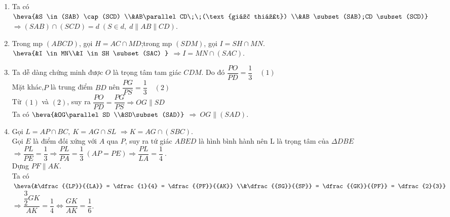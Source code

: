 \begin{ex}
{\begin{enumerate}
			\item  Ta có
			 $\heva{&S \in (SAB) \cap (SCD) \\&AB\parallel CD\;\;(\text{giả thiết}) \\&AB \subset (SAB);CD \subset (SCD)}$
			$ \Rightarrow (SAB) \cap (SCD) = d\;\left( {S \in d,\;d\parallel AB\parallel  CD} \right)$.
			\item 
			Trong mp $(ABCD)$, gọi $H=AC\cap MD$;trong  mp $(SDM)$, gọi $I=SH\cap MN$.\\
			$\heva{&I \in MN\\&I  \in SH \subset (SAC) }$
			$ \Rightarrow I =  MN \cap (SAC)$.
			\item Ta dễ dàng chứng minh được $O$ là trọng tâm tam giác $CDM$. Do  đó $\dfrac{PO}{PD}=\dfrac{1}{3}\quad (1)$\\
			Mặt khác,$P$ là trung điểm $BD$ nên  $ \dfrac{PG}{PS}=\dfrac{1}{3} \quad (2)$\\
			Từ $(1)$ và $(2)$, suy  ra $ \dfrac{PO}{PD}=\dfrac{PG}{PS}\Rightarrow OG$$\parallel$$SD$\\
			Ta  có
			$\heva{&OG\parallel  SD \\&SD\subset (SAD)}$
			 $ \Rightarrow \ OG\parallel(SAD)$.
			 \item
			Gọi $L=AP\cap BC,\ K=AG\cap SL$ $\Rightarrow K=AG\cap (SBC)$. \\Gọi $E$ là điểm đối xứng với  $A$ qua $P$, suy ra tứ giác $ABED$ là hình bình hành nên L là trọng tâm của $\Delta DBE$ $\Rightarrow \dfrac{PL}{PE}=\dfrac{1}{3}\Rightarrow \dfrac{PL}{PA}=\dfrac{1}{3}\ (AP=PE)\Rightarrow \dfrac{PL}{LA}=\dfrac{1}{4}\ $. \\
			Dựng $PF$$\parallel$$AK$. \\ 
			Ta có 
			$\heva{&\dfrac{{LP}}{{LA}} = \dfrac{1}{4} = \dfrac{{PF}}{{AK}} \\&\dfrac{{SG}}{{SP}}  = \dfrac{{GK}}{{PF}} = \dfrac{2}{3}}$ $ \Rightarrow $$\dfrac{{\dfrac{3}{2}GK}}{{AK}} = \dfrac{1}{4} \Leftrightarrow \dfrac{{GK}}{{AK}} = \dfrac{1}{6}$.
		\end{enumerate}
	} 
\end{ex}

